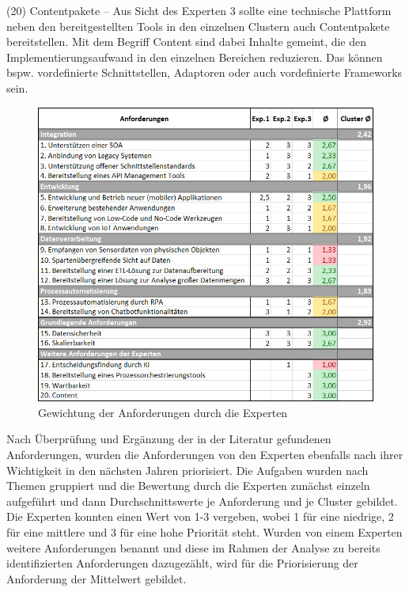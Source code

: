 (20) Contentpakete – Aus Sicht des Experten 3 sollte eine technische Plattform neben den bereitgestellten Tools in den einzelnen Clustern auch Contentpakete bereitstellen. Mit dem Begriff Content sind dabei Inhalte gemeint, die den Implementierungsaufwand in den einzelnen Bereichen reduzieren. Das können bspw. vordefinierte Schnittstellen, Adaptoren oder auch vordefinierte Frameworks sein. \autocite[Vgl.][]{SCHMIDT2023} 


\begin{figure}[h]
    \centering
    \includegraphics[width=1\textwidth]{img/Gewichtung_Anforderung.jpg}
    \caption[Gewichtung der Anforderungen durch die Experten]{Gewichtung der Anforderungen durch die Experten\autocite{Gewichtung}}
    \label{fig:Gewichtung}
\end{figure}

Nach Überprüfung und Ergänzung der in der Literatur gefundenen Anforderungen, wurden die Anforderungen von den Experten ebenfalls nach ihrer Wichtigkeit in den nächsten Jahren priorisiert. Die Aufgaben wurden nach Themen gruppiert und die Bewertung durch die Experten zunächst einzeln aufgeführt und dann Durchschnittswerte je Anforderung und je Cluster gebildet. Die Experten konnten einen Wert von 1-3 vergeben, wobei 1 für eine niedrige, 2 für eine mittlere und 3 für eine hohe Priorität steht. Wurden von einem Experten weitere Anforderungen benannt und diese im Rahmen der Analyse zu bereits identifizierten Anforderungen dazugezählt, wird für die Priorisierung der Anforderung der Mittelwert gebildet.


